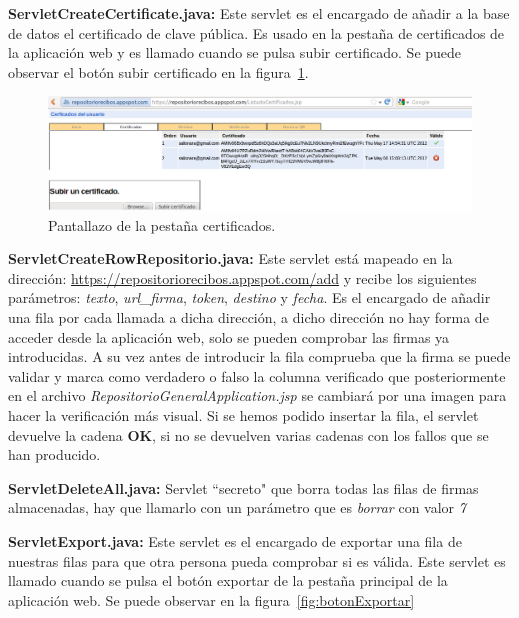 \begin{description}
\item \textbf{ServletCreateCertificate.java:} Este servlet es el encargado de añadir a la base de datos el certificado de clave pública. Es usado en la pestaña de certificados de la aplicación web y es llamado cuando se pulsa subir certificado. Se puede observar el botón subir certificado en la figura~\ref{fig:pestanhaCertificados}.

\begin{figure}
  \centering
    \includegraphics[scale=0.5]{./GoogleAppEngine/imagenes/certificadosRepositorioGeneral.png}
  \caption{Pantallazo de la pestaña certificados.}
  \label{fig:pestanhaCertificados}
\end{figure}

\item \textbf{ServletCreateRowRepositorio.java:} Este servlet está mapeado en la dirección: \url{https://repositoriorecibos.appspot.com/add} y recibe los siguientes parámetros: \textit{texto}, \textit{url\_firma}, \textit{token}, \textit{destino} y \textit{fecha}. Es el encargado de añadir una fila por cada llamada a dicha dirección, a dicho dirección no hay forma de acceder desde la aplicación web, solo se pueden comprobar las firmas ya introducidas. A su vez antes de introducir la fila comprueba que la firma se puede validar y marca como verdadero o falso la columna verificado que posteriormente en el archivo \textit{RepositorioGeneralApplication.jsp} se cambiará por una imagen para hacer la verificación más visual. Si se hemos podido insertar la fila, el servlet devuelve la cadena \textbf{OK}, si no se devuelven varias cadenas con los fallos que se han producido.

\item \textbf{ServletDeleteAll.java:} Servlet ``secreto" que borra todas las filas de firmas almacenadas, hay que llamarlo con un parámetro que es \textit{borrar} con valor \textit{7}

\item \textbf{ServletExport.java:} Este servlet es el encargado de exportar una fila de nuestras filas para que otra persona pueda comprobar si es válida. Este servlet es llamado cuando se pulsa el botón exportar de la pestaña principal de la aplicación web. Se puede observar en la figura~\ref{fig:botonExportar}


\end{description}
